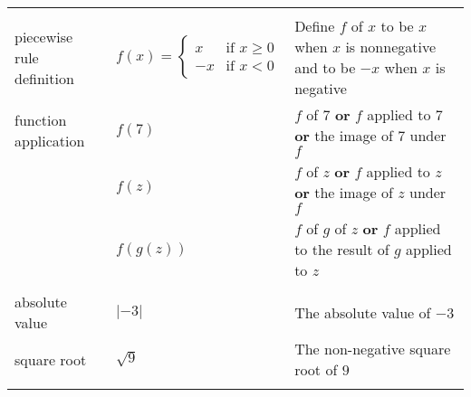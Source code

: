 \documentclass[12pt, oneside]{article}
\begin{document}
\begin{center}
\begin{tabular}{|llp{9.8cm}|}
&&\\
piecewise rule definition & $f(x) = \begin{cases} x & \text{if~}x \geq 0 \\ -x & \text{if~}x<0\end{cases}$ &
Define $f$ of $x$ to be $x$ when $x$ is nonnegative and to be $-x$ when $x$ is negative\\
function application & $f(7)$ & $f$ of $7$ {\bf or} $f$ applied to $7$ {\bf or} the image of $7$ under $f$\\
                     & $f(z)$ & $f$ of $z$ {\bf or} $f$ applied to $z$ {\bf or} the image of $z$ under $f$\\
                     & $f(g(z))$ & $f$ of $g$ of $z$ {\bf or} $f$ applied to the result of $g$ applied to $z$ \\
&&\\
absolute value & $\lvert -3 \rvert$ & The absolute value of $-3$ \\
square root & $\sqrt{9}$ & The non-negative square root of $9$ \\
&&\\
\hline
\end{tabular}
\end{center}
\end{document}
